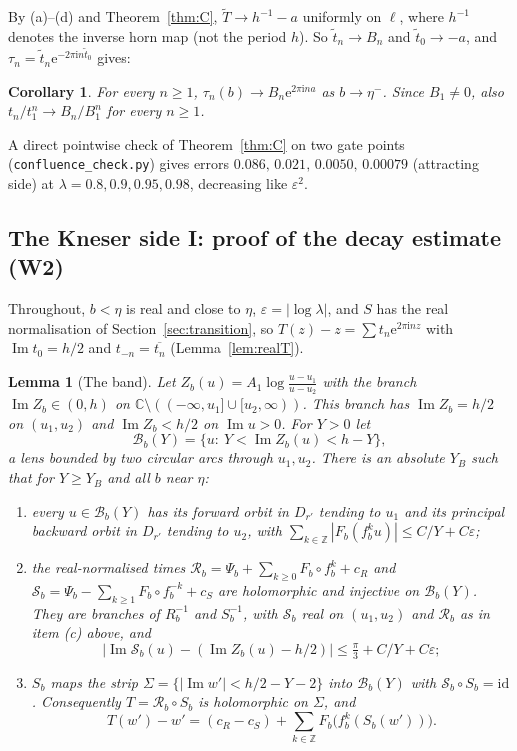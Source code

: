 \documentclass[11pt,a4paper]{article}
\newtheorem{lemma}[theorem]{Lemma}
\newtheorem{corollary}[theorem]{Corollary}
\theoremstyle{definition}
\newcommand{\Rr}{R}
\newcommand{\eee}{\mathrm{e}}
\newcommand{\ii}{\mathrm{i}}
\begin{document}
By (a)--(d) and Theorem~\ref{thm:C}, $\tilde T\to h^{-1}-a$ uniformly on
$\ell$, where $h^{-1}$ denotes the inverse horn map (not the period $h$).
So $\tilde t_n\to B_n$ and $\tilde t_0\to-a$, and
$\tau_n=\tilde t_n\eee^{-2\pi\ii n\tilde t_0}$ gives:

\begin{corollary}\label{cor:tauconv}
For every $n\ge1$, $\tau_n(b)\to B_n\eee^{2\pi\ii na}$ as $b\to\eta^-$.
Since $B_1\ne0$, also $t_n/t_1^n\to B_n/B_1^n$ for every $n\ge1$.
\end{corollary}

\noindent
A direct pointwise check of Theorem~\ref{thm:C} on two gate points
(\texttt{confluence\_check.py}) gives errors
$0.086,\,0.021,\,0.0050,\,0.00079$ (attracting side) at
$\lambda=0.8,0.9,0.95,0.98$, decreasing like $\varepsilon^2$.

\subsection{The Kneser side I: proof of the decay estimate (W2)}\label{sec:W2}

Throughout, $b<\eta$ is real and close to $\eta$, $\varepsilon=|\log\lambda|$,
and $S$ has the real normalisation of Section~\ref{sec:transition}, so
$T(z)-z=\sum t_n\eee^{2\pi\ii nz}$ with $\operatorname{Im}t_0=h/2$ and
$t_{-n}=\overline{t_n}$ (Lemma~\ref{lem:realT}).

\begin{lemma}[The band]\label{lem:band}
Let $Z_b(u)=A_1\log\frac{u-u_1}{u-u_2}$ with the branch
$\operatorname{Im}Z_b\in(0,h)$ on $\mathbb C\setminus((-\infty,u_1]\cup[u_2,\infty))$.
This branch has $\operatorname{Im}Z_b=h/2$ on $(u_1,u_2)$ and
$\operatorname{Im}Z_b<h/2$ on $\operatorname{Im}u>0$.  For $Y>0$ let
\[
 \mathcal B_b(Y)=\{u:\ Y<\operatorname{Im}Z_b(u)<h-Y\},
\]
a lens bounded by two circular arcs through $u_1,u_2$.  There is an absolute
$Y_B$ such that for $Y\ge Y_B$ and all $b$ near $\eta$:
\begin{enumerate}
\item[(i)] every $u\in\mathcal B_b(Y)$ has its forward orbit in $D_{r'}$ tending
  to $u_1$ and its principal backward orbit in $D_{r'}$ tending to $u_2$, with
  $\sum_{k\in\mathbb Z}|F_b(f_b^ku)|\le C/Y+C\varepsilon$;
\item[(ii)] the real-normalised times $\mathcal R_b=\Psi_b+\sum_{k\ge0}F_b\circ f_b^k+c_R$
  and $\mathcal S_b=\Psi_b-\sum_{k\ge1}F_b\circ f_b^{-k}+c_S$ are holomorphic and
  injective on $\mathcal B_b(Y)$.  They are branches of $\Rr_b^{-1}$ and
  $S_b^{-1}$, with $\mathcal S_b$ real on $(u_1,u_2)$ and $\mathcal R_b$ as in
  item (c) above, and
  \[
   \bigl|\operatorname{Im}\mathcal S_b(u)-(\operatorname{Im}Z_b(u)-h/2)\bigr|
   \le\tfrac\pi3+C/Y+C\varepsilon ;
  \]
\item[(iii)] $S_b$ maps the strip $\Sigma=\{|\operatorname{Im}w'|<h/2-Y-2\}$
  into $\mathcal B_b(Y)$ with $\mathcal S_b\circ S_b=\mathrm{id}$.  Consequently
  $T=\mathcal R_b\circ S_b$ is holomorphic on $\Sigma$, and
  \[
   T(w')-w'=(c_R-c_S)+\sum_{k\in\mathbb Z}F_b\bigl(f_b^k(S_b(w'))\bigr).
  \]
\end{enumerate}
\end{lemma}
\end{document}
